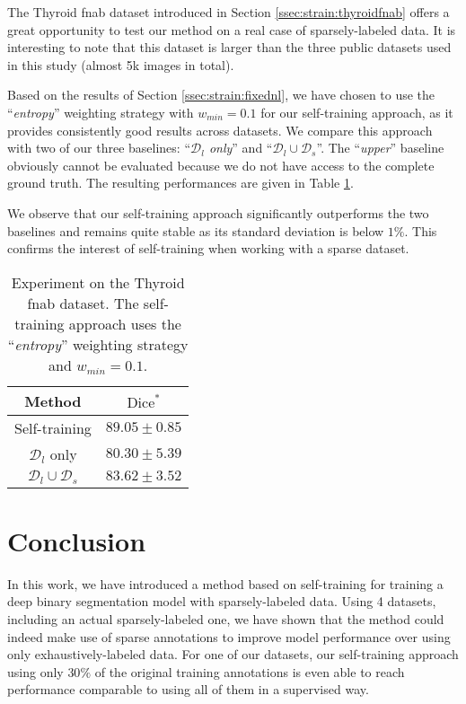 The Thyroid \acrshort{fnab} dataset introduced in Section \ref{ssec:strain:thyroidfnab} offers a great opportunity to test our method on a real case of sparsely-labeled data. It is interesting to note that this dataset is larger than the three public datasets used in this study (almost 5k images in total).

Based on the results of Section \ref{ssec:strain:fixednl}, we have chosen to use the ``\textit{entropy}'' weighting strategy with $w_{min} = 0.1$ for our self-training approach, as it provides consistently good results across datasets. We compare this approach with two of our three baselines: ``\textit{$\mathcal{D}_l$ only}'' and ``$\mathcal{D}_l \cup \mathcal{D}_s$''. The ``\textit{upper}'' baseline obviously cannot be evaluated because we do not have access to the complete ground truth. The resulting performances are given in Table \ref{tab:strain:thyroidresults}.

We observe that our self-training approach significantly outperforms the two baselines and remains quite stable as its standard deviation is below $1\%$. This confirms the interest of self-training when working with a sparse dataset. 

\begin{table}[t]
  \centering 
  \begin{tabular}{|c|c|}
    \hline
    Method & $\text{Dice}^*$ \\
    \hline
    Self-training & $89.05 \pm 0.85$ \\
    $\mathcal{D}_l$ only & $80.30 \pm 5.39$\\  
    $\mathcal{D}_l \cup \mathcal{D}_s$ & $83.62 \pm 3.52$\\
    \hline
  \end{tabular}
  \caption{Experiment on the Thyroid \acrshort{fnab} dataset. The self-training approach uses the ``\textit{entropy}'' weighting strategy and $w_{min} = 0.1$.}
  \label{tab:strain:thyroidresults}
\end{table}

\section{Conclusion}
\label{sec:strain:conclusion}

In this work, we have introduced a method based on self-training for training a deep binary segmentation model with sparsely-labeled data. Using 4 datasets, including an actual sparsely-labeled one, we have shown that the method could indeed make use of sparse annotations to improve model performance over using only exhaustively-labeled data. For one of our datasets, our self-training approach using only $30\%$ of the original training annotations is even able to reach performance comparable to using all of them in a supervised way.

